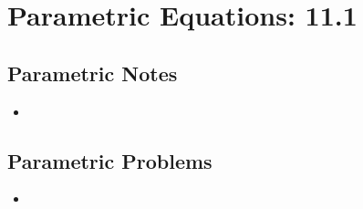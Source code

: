 \chapter{Parametric Equations: 11.1}
\section{Parametric Notes}
\begin{itemize}
  \item
\end{itemize}

\section{Parametric Problems}
\begin{itemize}
  \item
\end{itemize}
